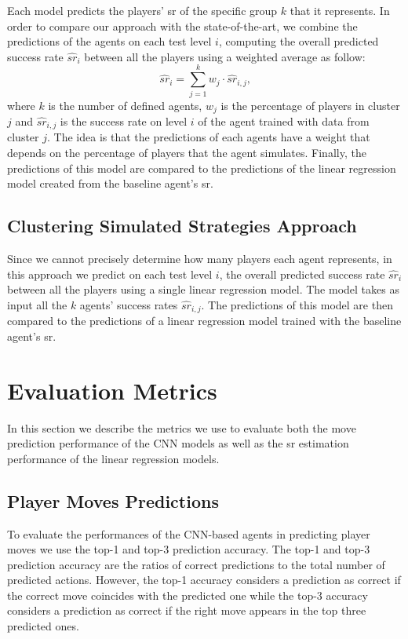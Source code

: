 Each model predicts the players' \acs{sr} of the specific group $k$ that it represents. In order to compare our approach with the state-of-the-art, we combine the predictions of the agents on each test level $i$, computing the overall predicted success rate $\widehat{sr}_i$ between all the players using a weighted average as follow:
\begin{equation}\label{combination}
    \widehat{sr}_i = \sum_{j = 1}^{k} w_j \cdot \widehat{sr}_{i,j}  \text{,}
\end{equation}
where $k$ is the number of defined agents, $w_j$ is the percentage of players in cluster $j$ and $\widehat{sr}_{i,j}$ is the success rate on level $i$ of the agent trained with data from cluster $j$.
The idea is that the predictions of each agents have a weight that depends on the percentage of players that the agent simulates.
Finally, the predictions of this model are compared to the predictions of the linear regression model created from the baseline agent's \acs{sr}.

\subsection{Clustering Simulated Strategies Approach}

Since we cannot precisely determine how many players each agent represents, in this approach we predict on each test level $i$, the overall predicted success rate $\widehat{sr}_i$ between all the players using a single linear regression model. The model takes as input all the $k$ agents' success rates $\widehat{sr}_{i,j}$. The predictions of this model are then compared to the predictions of a linear regression model trained with the baseline agent's \acs{sr}. 


\section{Evaluation Metrics}

In this section we describe the metrics we use to evaluate both the move prediction performance of the \acs{CNN} models as well as the \acs{sr} estimation performance of the linear regression models.

\subsection{Player Moves Predictions}
To evaluate the performances of the \acs{CNN}-based agents in predicting player moves we use the top-1 and top-3 prediction accuracy. The top-1 and top-3 prediction accuracy are the ratios of correct predictions to the total number of predicted actions. However, the top-1 accuracy considers a prediction as correct if the correct move coincides with the predicted one while the top-3 accuracy considers a prediction as correct if the right move appears in the top three predicted ones.

